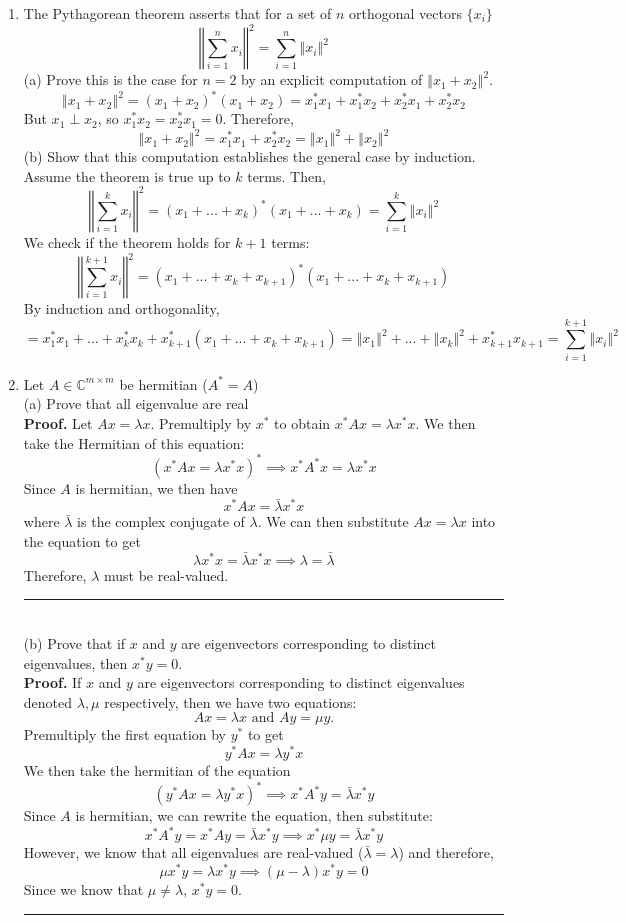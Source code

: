 \documentclass[12pt]{article}
\numberwithin{equation}{section}
\newcommand{\norm}[1]{\left\Vert#1\right\Vert}
\newenvironment{proof}[1][Proof]{\textbf{#1.} }{\ \rule{0.5em}{0.5em}}
\begin{document}
\begin{enumerate}
\item The Pythagorean theorem asserts that for a set of $n$ orthogonal vectors $\{x_i\}$
$$\norm{\sum_{i=1}^n x_i}^2=\sum_{i=1}^n\norm{x_i}^2$$
(a) Prove this is the case for $n=2$ by an explicit computation of $\norm{x_1+x_2}^2$.\\
$$\norm{x_1+x_2}^2=(x_1+x_2)^*(x_1+x_2)=x_1^*x_1+x_1^*x_2+x_2^*x_1+x_2^*x_2$$
But $x_1\perp x_2$, so $x_1^*x_2=x_2^*x_1=0$. Therefore,
$$\norm{x_1+x_2}^2=x_1^*x_1+x_2^*x_2=\norm{x_1}^2+\norm{x_2}^2$$
(b) Show that this computation establishes the general case by induction.\\
Assume the theorem is true up to $k$ terms. Then,
$$\norm{\sum_{i=1}^k x_i}^2=(x_1+...+x_k)^*(x_1+...+x_k)=\sum_{i=1}^k\norm{x_i}^2$$
We check if the theorem holds for $k+1$ terms:
$$\norm{\sum_{i=1}^{k+1} x_i}^2=(x_1+...+x_k+x_{k+1})^*(x_1+...+x_k+x_{k+1})$$ By induction and orthogonality,
$$=x_1^*x_1+...+x_k^*x_k+x_{k+1}^*(x_1+...+x_k+x_{k+1})=\norm{x_1}^2+...+\norm{x_k}^2+x_{k+1}^*x_{k+1}=\sum_{i=1}^{k+1}\norm{x_i}^2$$
\item Let $A\in \mathbb{C}^{m\times m}$ be hermitian ($A^*=A$)\\
(a) Prove that all eigenvalue are real\\
\begin{proof} Let $Ax=\lambda x$. Premultiply by $x^*$ to obtain $x^*Ax=\lambda x^*x$. We then take the Hermitian of this equation:
$$(x^*Ax=\lambda x^*x)^*\implies x^*A^*x=\lambda x^*x$$
Since $A$ is hermitian, we then have
$$x^*Ax=\bar{\lambda} x^*x$$
where $\bar{\lambda}$ is the complex conjugate of $\lambda$. We can then substitute $Ax=\lambda x$ into the equation to get
$$\lambda x^*x=\bar{\lambda}x^*x\implies\lambda=\bar{\lambda}$$
Therefore, $\lambda$ must be real-valued.
\end{proof}\\
(b) Prove that if $x$ and $y$ are eigenvectors corresponding to distinct eigenvalues, then $x^* y=0$.\\
\begin{proof} If $x$ and $y$ are eigenvectors corresponding to distinct eigenvalues denoted $\lambda,\mu$ respectively, then we have two equations:
$$Ax=\lambda x \text{  and  } Ay=\mu y.$$
Premultiply the first equation by $y^*$ to get
$$y^*Ax=\lambda y^*x$$
We then take the hermitian of the equation
$$(y^*Ax=\lambda y^*x)^*\implies x^*A^*y=\bar{\lambda}x^*y$$
Since $A$ is hermitian, we can rewrite the equation, then substitute:
$$x^*A^*y=x^*Ay=\bar{\lambda}x^*y\implies x^*\mu y=\bar{\lambda}x^*y$$
However, we know that all eigenvalues are real-valued ($\bar{\lambda}=\lambda$) and therefore,
$$\mu x^*y=\lambda x^* y\implies (\mu-\lambda)x^*y=0$$
Since we know that $\mu\neq\lambda$, $x^*y=0$.
\end{proof}


\end{enumerate}
\end{document}
